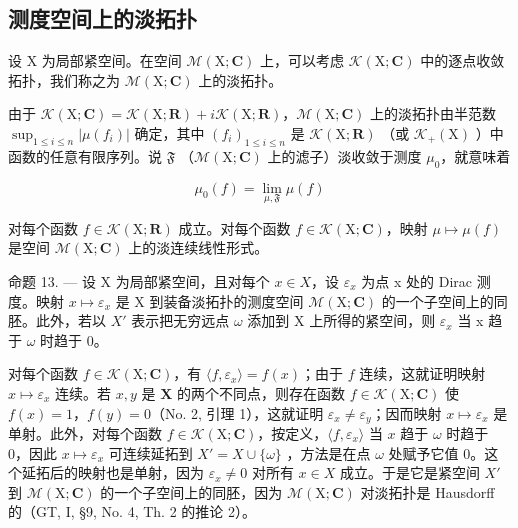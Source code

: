 \subsection{测度空间上的淡拓扑}

设 X 为局部紧空间。在空间 \(\mathcal{M}(\mathrm{X};\mathbf{C})\) 上，可以考虑 \(\mathcal{K}(\mathrm{X};\mathbf{C})\) 中的逐点收敛拓扑，我们称之为 \(\mathcal{M}(\mathrm{X};\mathbf{C})\) 上的淡拓扑。

由于 \(\mathcal{K}(\mathrm{X};\mathbf{C}) = \mathcal{K}(\mathrm{X};\mathbf{R}) + i\mathcal{K}(\mathrm{X};\mathbf{R})\)，\(\mathcal{M}(\mathrm{X};\mathbf{C})\) 上的淡拓扑由半范数 \(\sup_{1\leqslant i\leqslant n}|\mu (f_i)|\) 确定，其中 \((f_i)_{1\leqslant i\leqslant n}\) 是 \(\mathcal{K}(\mathrm{X};\mathbf{R})\) （或 \(\mathcal{K}_{+}(\mathrm{X})\) ）中函数的任意有限序列。说 \(\mathfrak{F}\) （\(\mathcal{M}(\mathrm{X};\mathbf{C})\) 上的滤子）淡收敛于测度 \(\mu_0\)，就意味着

\[
\mu_ {0} (f) = \lim _ {\mu , \mathfrak {F}} \mu (f)
\]

对每个函数 \(f \in \mathcal{K}(\mathrm{X};\mathbf{R})\) 成立。对每个函数 \(f \in \mathcal{K}(\mathrm{X};\mathbf{C})\)，映射 \(\mu \mapsto \mu(f)\) 是空间 \(\mathcal{M}(\mathrm{X};\mathbf{C})\) 上的淡连续线性形式。

命题 13. --- 设 X 为局部紧空间，且对每个 \(x \in X\)，设 \(\varepsilon_{x}\) 为点 x 处的 Dirac 测度。映射 \(x \mapsto \varepsilon_{x}\) 是 X 到装备淡拓扑的测度空间 \(\mathcal{M}(\mathrm{X};\mathbf{C})\) 的一个子空间上的同胚。此外，若以 \(X'\) 表示把无穷远点 \(\omega\) 添加到 X 上所得的紧空间，则 \(\varepsilon_{x}\) 当 x 趋于 \(\omega\) 时趋于 0。

对每个函数 \(f \in \mathcal{K}(\mathrm{X};\mathbf{C})\)，有 \(\langle f,\varepsilon_x\rangle = f(x)\)；由于 \(f\) 连续，这就证明映射 \(x \mapsto \varepsilon_x\) 连续。若 \(x,y\) 是 \(\mathbf{X}\) 的两个不同点，则存在函数 \(f \in \mathcal{K}(\mathrm{X};\mathbf{C})\) 使 \(f(x) = 1\)，\(f(y) = 0\)（No. 2, 引理 1），这就证明 \(\varepsilon_x \neq \varepsilon_y\)；因而映射 \(x \mapsto \varepsilon_x\) 是单射。此外，对每个函数 \(f \in \mathcal{K}(\mathrm{X};\mathbf{C})\)，按定义，\(\langle f,\varepsilon_x\rangle\) 当 \(x\) 趋于 \(\omega\) 时趋于 0，因此 \(x \mapsto \varepsilon_x\) 可连续延拓到 \(X' = X \cup \{\omega\}\) ，方法是在点 \(\omega\) 处赋予它值 0。这个延拓后的映射也是单射，因为 \(\varepsilon_x \neq 0\) 对所有 \(x \in X\) 成立。于是它是紧空间 \(X'\) 到 \(\mathcal{M}(\mathrm{X};\mathbf{C})\) 的一个子空间上的同胚，因为 \(\mathcal{M}(\mathrm{X};\mathbf{C})\) 对淡拓扑是 Hausdorff 的（GT, I, §9, No. 4, Th. 2 的推论 2）。

